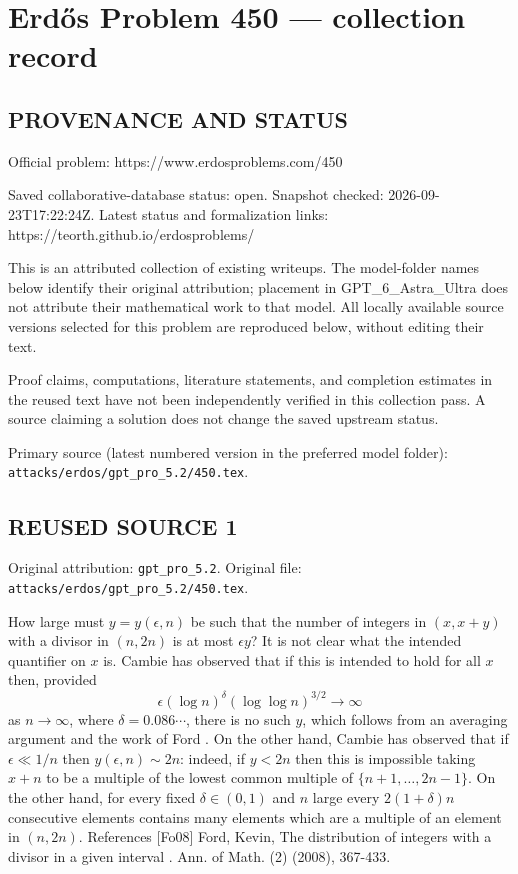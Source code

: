 \section*{Erd\H{o}s Problem 450 --- collection record}

\subsection*{PROVENANCE AND STATUS}
Official problem: https://www.erdosproblems.com/450

Saved collaborative-database status: open.
Snapshot checked: 2026-09-23T17:22:24Z.
Latest status and formalization links: https://teorth.github.io/erdosproblems/

This is an attributed collection of existing writeups. The model-folder names below identify their original attribution; placement in GPT\_6\_Astra\_Ultra does not attribute their mathematical work to that model. All locally available source versions selected for this problem are reproduced below, without editing their text.

Proof claims, computations, literature statements, and completion estimates in the reused text have not been independently verified in this collection pass. A source claiming a solution does not change the saved upstream status.

Primary source (latest numbered version in the preferred model folder): \texttt{attacks/erdos/gpt\_pro\_5.2/450.tex}.

\subsection*{REUSED SOURCE 1}
Original attribution: \texttt{gpt\_pro\_5.2}.
Original file: \texttt{attacks/erdos/gpt\_pro\_5.2/450.tex}.


How large must $y=y(\epsilon,n)$ be such that the number of integers in $(x,x+y)$ with a divisor in $(n,2n)$ is at most $\epsilon y$? It is not clear what the intended quantifier on $x$ is. Cambie has observed that if this is intended to hold for all $x$ then, provided\[\epsilon(\log n)^\delta (\log\log n)^{3/2}\to \infty\]as $n\to \infty$, where $\delta=0.086\cdots$, there is no such $y$, which follows from an averaging argument and the work of Ford \cite{Fo08}. On the other hand, Cambie has observed that if $\epsilon\ll 1/n$ then $y(\epsilon,n)\sim 2n$: indeed, if $y<2n$ then this is impossible taking $x+n$ to be a multiple of the lowest common multiple of $\{n+1,\ldots,2n-1\}$. On the other hand, for every fixed $\delta\in (0,1)$ and $n$ large every $2(1+\delta)n$ consecutive elements contains many elements which are a multiple of an element in $(n,2n)$. References [Fo08] Ford, Kevin, The distribution of integers with a divisor in a given interval . Ann. of Math. (2) (2008), 367-433.


